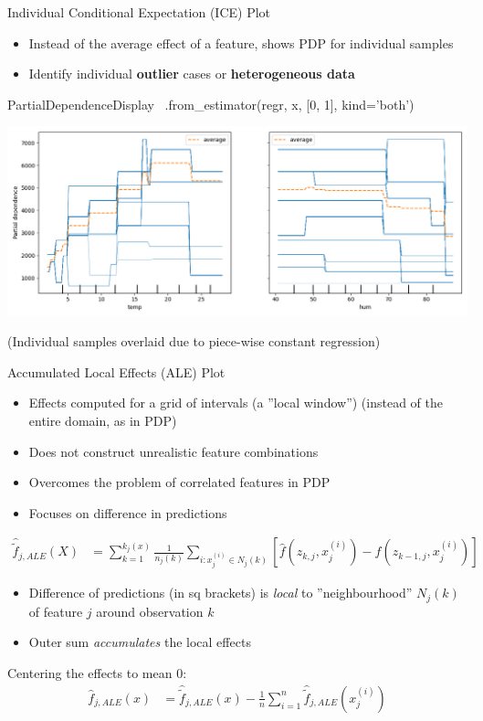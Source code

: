 \documentclass[ignorenonframetext,xcolor=x11names]{beamer}
\begin{document}
\begin{frame}[fragile]{Individual Conditional Expectation (ICE) Plot}
\begin{itemize}
\item Instead of the average effect of a feature, shows PDP for individual samples
\item Identify individual \textbf{outlier} cases or \textbf{heterogeneous data}
\end{itemize} 
\begin{pythoncode}
PartialDependenceDisplay \
    .from_estimator(regr, x, [0, 1], kind='both')
\end{pythoncode}
\begin{center}
\includegraphics[width=.75\textwidth]{ice_pdp_reg.png}
\end{center}

\footnotesize (Individual samples overlaid due to piece-wise constant regression)
\end{frame}

\begin{frame}[fragile]{Accumulated Local Effects (ALE) Plot}
\begin{itemize}
   \item Effects computed for a grid of intervals (a ''local window'') (instead of the entire domain, as in PDP)
   \item Does not construct unrealistic feature combinations
   \item Overcomes the problem  of correlated features in PDP
   \item Focuses on difference in predictions
\end{itemize}
\begin{align*}
\hat{\tilde{f}}_{j, ALE}(X) &= \sum_{k=1}^{k_j(x)} \frac{1}{n_j(k)} \sum_{i:x_j^{(i)} \in N_j(k)} \left[\hat{f}(z_{k, j}, x^{(i)}_j) - \hat{f} (z_{k-1, j},x^{(i)}_j) \right]
\end{align*}
\begin{itemize}
   \item Difference of predictions (in sq brackets) is \emph{local} to ''neighbourhood'' $N_j(k)$ of feature $j$ around observation $k$
   \item Outer sum \emph{accumulates} the local effects
\end{itemize}
Centering the effects to mean 0:
\begin{align*}
\hat{f}_{j, ALE}(x) &= \hat{\tilde{f}}_{j, ALE} (x) - \frac{1}{n} \sum_{i=1}^n \hat{\tilde{f}}_{j, ALE}(x_j^{(i)})
\end{align*}
\end{frame}
\end{document}
